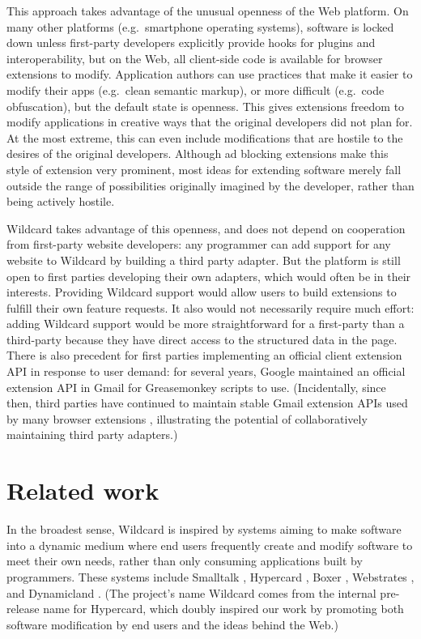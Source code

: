 \documentclass[english,submission]{programming}
\begin{document}
This approach takes advantage of the unusual openness of the Web
platform. On many other platforms (e.g.~smartphone operating systems),
software is locked down unless first-party developers explicitly provide
hooks for plugins and interoperability, but on the Web, all client-side
code is available for browser extensions to modify. Application authors
can use practices that make it easier to modify their apps (e.g.~clean
semantic markup), or more difficult (e.g.~code obfuscation), but the
default state is openness. This gives extensions freedom to modify
applications in creative ways that the original developers did not plan
for. At the most extreme, this can even include modifications that are
hostile to the desires of the original developers. Although ad blocking
extensions make this style of extension very prominent, most ideas for
extending software merely fall outside the range of possibilities
originally imagined by the developer, rather than being actively
hostile.

Wildcard takes advantage of this openness, and does not depend on
cooperation from first-party website developers: any programmer can add
support for any website to Wildcard by building a third party adapter.
But the platform is still open to first parties developing their own
adapters, which would often be in their interests. Providing Wildcard
support would allow users to build extensions to fulfill their own
feature requests. It also would not necessarily require much effort:
adding Wildcard support would be more straightforward for a first-party
than a third-party because they have direct access to the structured
data in the page. There is also precedent for first parties implementing
an official client extension API in response to user demand: for several
years, Google maintained an official extension API in Gmail for
Greasemonkey scripts to use. (Incidentally, since then, third parties
have continued to maintain stable Gmail extension APIs used by many
browser extensions \autocite{streak,talwar2019}, illustrating the
potential of collaboratively maintaining third party adapters.)

\hypertarget{related-work}{%
\section{Related work}\label{related-work}}

In the broadest sense, Wildcard is inspired by systems aiming to make
software into a dynamic medium where end users frequently create and
modify software to meet their own needs, rather than only consuming
applications built by programmers. These systems include Smalltalk
\autocite{kay1977}, Hypercard \autocite{hypercard2019}, Boxer
\autocite{disessa1986}, Webstrates \autocite{klokmose2015}, and
Dynamicland \autocite{victor}. (The project's name Wildcard comes from
the internal pre-release name for Hypercard, which doubly inspired our
work by promoting both software modification by end users and the ideas
behind the Web.)
\end{document}
